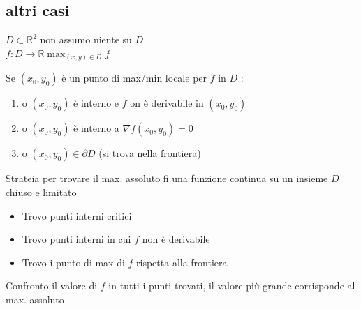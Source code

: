 \documentclass[a4paper, oneside]{article}
\begin{document}
        \subsection{altri casi}
        $D \subset \mathbb{R}^2$ non assumo niente su $D$\\
        $f:D \to \mathbb{R} \max_{(x,y) \in D} f$
        \begin{theorem}
            Se $(x_0,y_0)$ è un punto di max/min locale per $f$ in $D$ :
            \begin{enumerate}[$i)$]
                \item o $(x_0,y_0)$ è interno e $f$ on è derivabile in $(x_0,y_0)$
                \item o $(x_0,y_0)$ è interno a $\nabla f (x_0,y_0) = 0$
                \item o $(x_0,y_0) \in \partial D$ (si trova nella frontiera)  
            \end{enumerate}
        \end{theorem}
        \begin{proposition}
            Strateia per trovare il max. assoluto fi una funzione continua su un insieme $D$ chiuso e limitato\\
            \begin{itemize}
                \item Trovo punti interni critici
                \item Trovo punti interni in cui $f$ non è derivabile
                \item Trovo i punto di max di $f$ rispetta alla frontiera
            \end{itemize}
            Confronto il valore di $f$ in tutti i punti trovati, il valore più grande corrisponde al max. assoluto
        \end{proposition}
\end{document}
